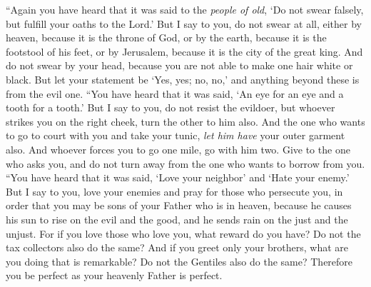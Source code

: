 \begin{biblechapter}
 “Again you have heard that it was said to the \textit{people of old}, ‘Do not swear falsely, but fulfill your oaths to the Lord.’
\verse But I say to you, do not swear at all, either by heaven, because it is the throne of God,
\verse or by the earth, because it is the footstool of his feet, or by Jerusalem, because it is the city of the great king.
\verse And do not swear by your head, because you are not able to make one hair white or black.
\verse But let your statement be ‘Yes, yes; no, no,’ and anything beyond these is from the evil one.
 “You have heard that it was said, ‘An eye for an eye and a tooth for a tooth.’
\verse But I say to you, do not resist the evildoer, but whoever strikes you on the right cheek, turn the other to him also.
\verse And the one who wants to go to court with you and take your tunic, \textit{let him have} your outer garment also.
\verse And whoever forces you to go one mile, go with him two.
\verse Give to the one who asks you, and do not turn away from the one who wants to borrow from you.
 “You have heard that it was said, ‘Love your neighbor’ and ‘Hate your enemy.’
\verse But I say to you, love your enemies and pray for those who persecute you,
\verse in order that you may be sons of your Father who is in heaven, because he causes his sun to rise on the evil and the good, and he sends rain on the just and the unjust.
\verse For if you love those who love you, what reward do you have? Do not the tax collectors also do the same?
\verse And if you greet only your brothers, what are you doing that is remarkable? Do not the Gentiles also do the same?
\verse Therefore you be perfect as your heavenly Father is perfect.
\end{biblechapter}


